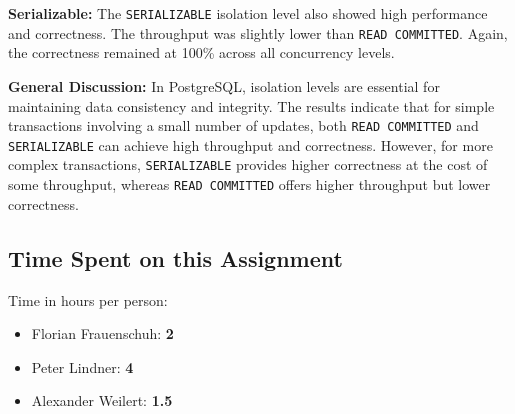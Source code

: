 \documentclass[11pt]{scrartcl}
\begin{document}
\textbf{Serializable:}
The \lstinline[style=dbtsql]{SERIALIZABLE} isolation level also showed high performance and correctness.
The throughput was slightly lower than \lstinline[style=dbtsql]{READ COMMITTED}.
Again, the correctness remained at 100\% across all concurrency levels.

\textbf{General Discussion:}
In PostgreSQL, isolation levels are essential for maintaining data consistency and integrity.
The results indicate that for simple transactions involving a small number of updates, both
\lstinline[style=dbtsql]{READ COMMITTED} and \lstinline[style=dbtsql]{SERIALIZABLE} can achieve high throughput and correctness.
However, for more complex transactions, \lstinline[style=dbtsql]{SERIALIZABLE} provides higher correctness at the cost of some throughput,
whereas \lstinline[style=dbtsql]{READ COMMITTED} offers higher throughput but lower correctness.

\subsection*{Time Spent on this Assignment}

Time in hours per person:

\begin{itemize}
  \item Florian Frauenschuh: \textbf{2}
  \item Peter Lindner: \textbf{4}
  \item Alexander Weilert: \textbf{1.5}
\end{itemize}

\printbibliography[title=References]
\end{document}
